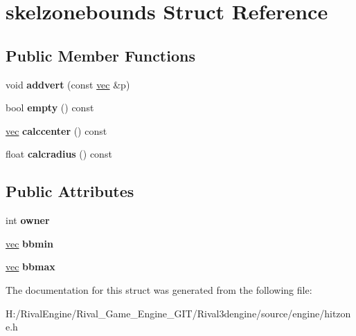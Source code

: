 \hypertarget{structskelzonebounds}{}\section{skelzonebounds Struct Reference}
\label{structskelzonebounds}
\subsection*{Public Member Functions}
\begin{DoxyCompactItemize}
\item 
\mbox{\label{structskelzonebounds_aefada2b9b29ec4e4ccc9756d3f5d11a3}} 
void {\bfseries addvert} (const \hyperlink{structvec}{vec} \&p)
\item 
\mbox{\label{structskelzonebounds_a3a6676d64ccc7fa53484ef842276d570}} 
bool {\bfseries empty} () const
\item 
\mbox{\label{structskelzonebounds_a09ed73cd007e601e21c314e9c818ee67}} 
\hyperlink{structvec}{vec} {\bfseries calccenter} () const
\item 
\mbox{\label{structskelzonebounds_ad8725798aa9c7755a42c6156fd93bc6f}} 
float {\bfseries calcradius} () const
\end{DoxyCompactItemize}
\subsection*{Public Attributes}
\begin{DoxyCompactItemize}
\item 
\mbox{\label{structskelzonebounds_a18cf42b070ad00347c9ac6af88ea516d}} 
int {\bfseries owner}
\item 
\mbox{\label{structskelzonebounds_a4c4acebacad31b4430c381e8dba9977f}} 
\hyperlink{structvec}{vec} {\bfseries bbmin}
\item 
\mbox{\label{structskelzonebounds_a484ffa667ec6f4a35fadd9adedc4c0a1}} 
\hyperlink{structvec}{vec} {\bfseries bbmax}
\end{DoxyCompactItemize}


The documentation for this struct was generated from the following file\+:\begin{DoxyCompactItemize}
\item 
H\+:/\+Rival\+Engine/\+Rival\+\_\+\+Game\+\_\+\+Engine\+\_\+\+G\+I\+T/\+Rival3dengine/source/engine/hitzone.\+h\end{DoxyCompactItemize}
